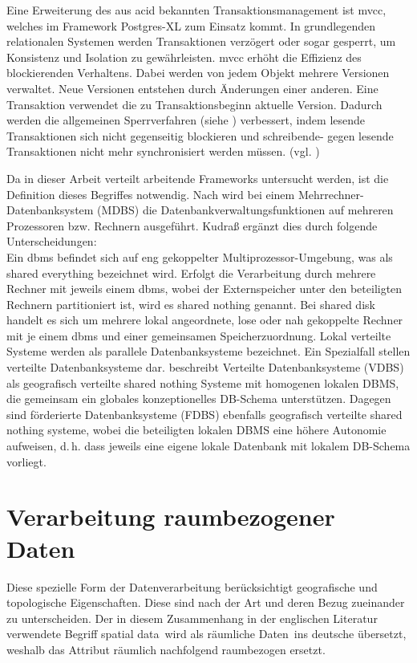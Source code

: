 Eine Erweiterung des aus \Gls{acid} bekannten Transaktionsmanagement ist \Gls{mvcc}, welches im Framework Postgres-XL zum Einsatz kommt.
In grundlegenden relationalen Systemen werden Transaktionen verzögert oder sogar gesperrt, um Konsistenz und Isolation zu gewährleisten.
\Gls{mvcc} erhöht die Effizienz des  blockierenden Verhaltens.
Dabei werden von jedem Objekt mehrere Versionen verwaltet.
Neue Versionen entstehen durch Änderungen einer anderen.
Eine Transaktion verwendet die zu Transaktionsbeginn aktuelle Version.
Dadurch werden die allgemeinen Sperrverfahren (siehe \cite[S.266 ff.]{book:kudrass}) verbessert, indem lesende Transaktionen sich nicht gegenseitig blockieren und schreibende- gegen lesende Transaktionen nicht mehr synchronisiert werden müssen. (vgl. \cite[S.270]{book:kudrass})

Da in dieser Arbeit verteilt arbeitende Frameworks untersucht werden, ist die Definition dieses Begriffes notwendig.
Nach \cite[S.394]{book:kudrass} wird bei einem Mehrrechner-Datenbanksystem (MDBS) die Datenbankverwaltungsfunktionen auf mehreren Prozessoren bzw. Rechnern ausgeführt.
Kudraß ergänzt dies durch folgende Unterscheidungen:\\
Ein \Gls{dbms} befindet sich auf eng gekoppelter Multiprozessor-Umgebung, was als shared everything bezeichnet wird.
Erfolgt die Verarbeitung durch mehrere Rechner mit jeweils einem \Gls{dbms}, wobei der Externspeicher unter den beteiligten Rechnern partitioniert ist, wird es shared nothing genannt.
Bei shared disk handelt es sich um mehrere lokal angeordnete, lose oder nah gekoppelte Rechner mit je einem \Gls{dbms} und einer gemeinsamen Speicherzuordnung.
Lokal verteilte Systeme werden als parallele Datenbanksysteme bezeichnet.
Ein Spezialfall stellen verteilte Datenbanksysteme dar.
\cite[S.398]{book:kudrass} beschreibt Verteilte Datenbanksysteme (VDBS) als geografisch verteilte shared nothing Systeme mit homogenen lokalen DBMS, die gemeinsam ein globales konzeptionelles DB-Schema unterstützen.
Dagegen sind förderierte Datenbanksysteme (FDBS) ebenfalls geografisch verteilte shared nothing systeme, wobei die beteiligten lokalen DBMS eine höhere Autonomie aufweisen, d.\,h. dass jeweils eine eigene lokale Datenbank mit lokalem DB-Schema vorliegt.


\section{Verarbeitung raumbezogener Daten}
Diese spezielle Form der Datenverarbeitung berücksichtigt geografische und topologische Eigenschaften.
Diese sind nach der Art und deren Bezug zueinander zu unterscheiden.
Der in diesem Zusammenhang in der englischen Literatur verwendete Begriff \glqq{}spatial data\grqq\ wird als \glqq{}räumliche Daten\grqq\ ins deutsche übersetzt, weshalb das Attribut räumlich nachfolgend raumbezogen ersetzt.

